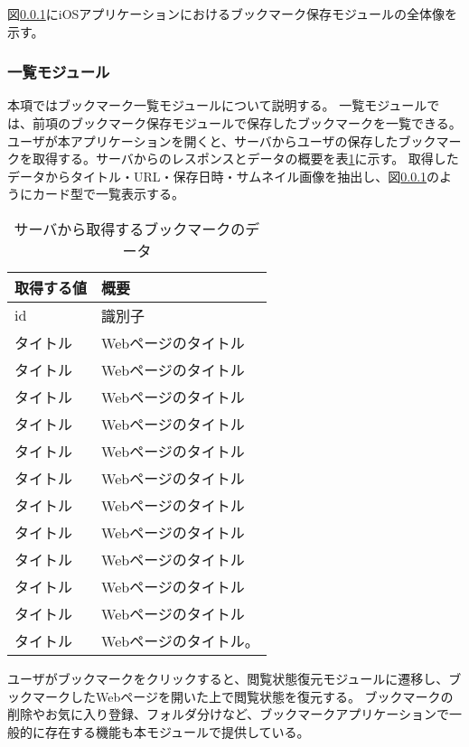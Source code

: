 図\ref{}にiOSアプリケーションにおけるブックマーク保存モジュールの全体像を示す。

\subsubsection{一覧モジュール}
本項ではブックマーク一覧モジュールについて説明する。
一覧モジュールでは、前項のブックマーク保存モジュールで保存したブックマークを一覧できる。
ユーザが本アプリケーションを開くと、サーバからユーザの保存したブックマークを取得する。サーバからのレスポンスとデータの概要を表\ref{tb:ios-bookmark-response}に示す。
取得したデータからタイトル・URL・保存日時・サムネイル画像を抽出し、図\ref{}のようにカード型で一覧表示する。

\begin{table}[htbp]
  \label{tb:ios-bookmark-response}
  \caption{サーバから取得するブックマークのデータ}
  \begin{center}
    \begin{tabular}{|l|l|}
    \hline
    取得する値 & 概要 \\ \hline
    id & 識別子 \\ \hline
    タイトル & Webページのタイトル \\ \hline
    タイトル & Webページのタイトル \\ \hline
    タイトル & Webページのタイトル \\ \hline
    タイトル & Webページのタイトル \\ \hline
    タイトル & Webページのタイトル \\ \hline
    タイトル & Webページのタイトル \\ \hline
    タイトル & Webページのタイトル \\ \hline
    タイトル & Webページのタイトル \\ \hline
    タイトル & Webページのタイトル \\ \hline
    タイトル & Webページのタイトル \\ \hline
    タイトル & Webページのタイトル \\ \hline
    タイトル & Webページのタイトル。 \\ \hline
    \end{tabular}
  \end{center}
\end{table}

ユーザがブックマークをクリックすると、閲覧状態復元モジュールに遷移し、ブックマークしたWebページを開いた上で閲覧状態を復元する。
ブックマークの削除やお気に入り登録、フォルダ分けなど、ブックマークアプリケーションで一般的に存在する機能も本モジュールで提供している。

